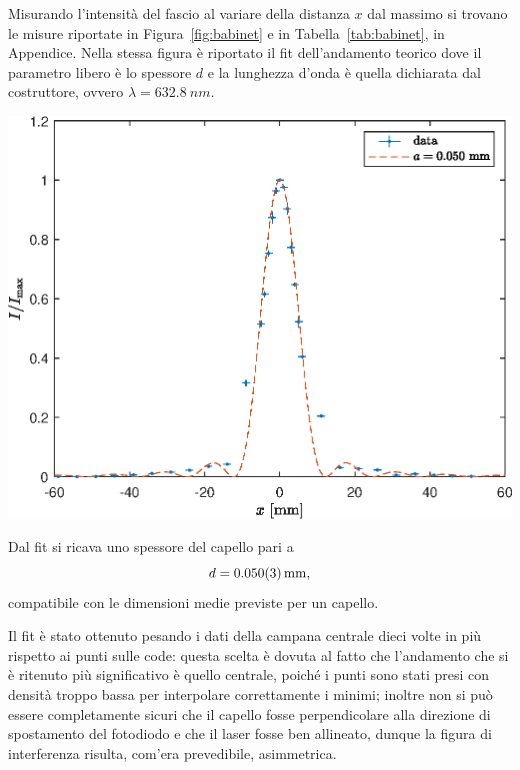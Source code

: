 \documentclass[10pt,oneside,a4paper]{article}
\newenvironment{Figure}
  {\par\medskip\noindent\minipage{\linewidth}}
  {\endminipage\par\medskip}
\begin{document}
\begin{multicols}{2}
Misurando l'intensità del fascio al variare della distanza $x$ dal massimo si trovano le misure riportate in Figura~\ref{fig:babinet} e in Tabella~\ref{tab:babinet}, in Appendice. Nella stessa figura è riportato il fit dell'andamento teorico dove il parametro libero è lo spessore $d$ e la lunghezza d'onda è quella dichiarata dal costruttore, ovvero $\lambda = \SI{632.8}{nm}$.
\begin{Figure}
	\begin{center}
	\includegraphics[width=\linewidth]{babinet.eps}
	\label{fig:babinet}
	\end{center}
\end{Figure}

Dal fit si ricava uno spessore del capello pari a 
\[
	d = \SI{0.050 \pm 0.003}{mm},
\]
compatibile con le dimensioni medie previste per un capello.

Il fit è stato ottenuto pesando i dati della campana centrale dieci volte in più rispetto ai punti sulle code: questa scelta è dovuta al fatto che l'andamento che si è ritenuto più significativo è quello centrale, poiché i punti sono stati presi con densità troppo bassa per interpolare correttamente i minimi; inoltre non si può essere completamente sicuri che il capello fosse perpendicolare alla direzione di spostamento del fotodiodo e che il laser fosse ben allineato, dunque la figura di interferenza risulta, com'era prevedibile, asimmetrica. 


\end{multicols}
\end{document}
